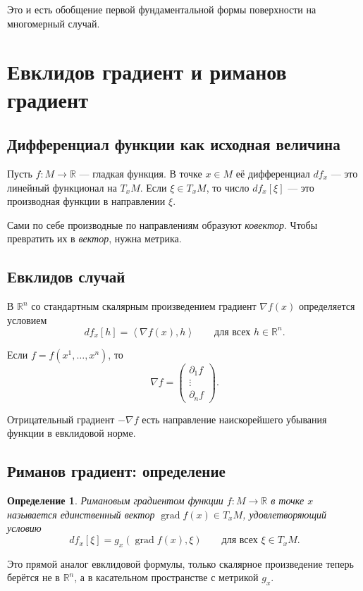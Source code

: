 \documentclass[12pt,a4paper]{article}
\theoremstyle{rudef}
\newtheorem{definition}{Определение}[section]
\theoremstyle{ruplain}
\newcommand{\R}{\mathbb{R}}
\newcommand{\grad}{\operatorname{grad}}
\newcommand{\ip}[2]{\left\langle #1,#2\right\rangle}
\begin{document}
Это и есть обобщение первой фундаментальной формы поверхности на многомерный случай.

\section{Евклидов градиент и риманов градиент}

\subsection{Дифференциал функции как исходная величина}

Пусть $f:M\to \R$ --- гладкая функция. В точке $x\in M$ её дифференциал $df_x$ --- это линейный функционал на $T_xM$. Если $\xi\in T_xM$, то число $df_x[\xi]$ --- это производная функции в направлении $\xi$.

Сами по себе производные по направлениям образуют \emph{ковектор}. Чтобы превратить их в \emph{вектор}, нужна метрика.

\subsection{Евклидов случай}

В $\R^n$ со стандартным скалярным произведением градиент $\nabla f(x)$ определяется условием
\[
df_x[h]=\ip{\nabla f(x)}{h}
\qquad \text{для всех } h\in \R^n.
\]

Если $f=f(x^1,\dots,x^n)$, то
\[
\nabla f = \begin{pmatrix} \partial_1 f \\ \vdots \\ \partial_n f \end{pmatrix}.
\]

Отрицательный градиент $-\nabla f$ есть направление наискорейшего убывания функции в евклидовой норме.

\subsection{Риманов градиент: определение}

\begin{definition}
Римановым градиентом функции $f:M\to \R$ в точке $x$ называется единственный вектор $\grad f(x)\in T_xM$, удовлетворяющий условию
\[
df_x[\xi]=g_x(\grad f(x),\xi)
\qquad \text{для всех } \xi\in T_xM.
\]
\end{definition}

Это прямой аналог евклидовой формулы, только скалярное произведение теперь берётся не в $\R^n$, а в касательном пространстве с метрикой $g_x$.
\end{document}

